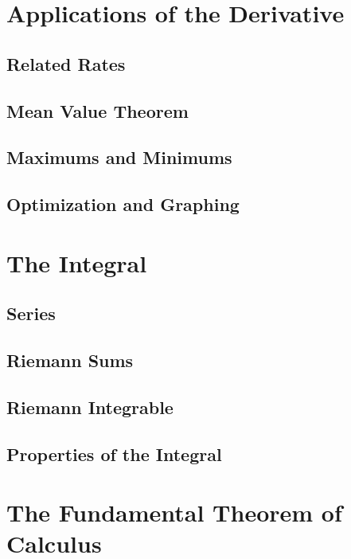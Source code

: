 \documentclass{amsbook}
\begin{document}

\chapter{Applications of the Derivative}

\section{Related Rates}

\section{Mean Value Theorem}

\section{Maximums and Minimums}

\section{Optimization and Graphing}


\chapter{The Integral}
\section{Series}

\section{Riemann Sums}

\section{Riemann Integrable}

\section{Properties of the Integral}


\chapter{The Fundamental Theorem of Calculus}
\end{document}
